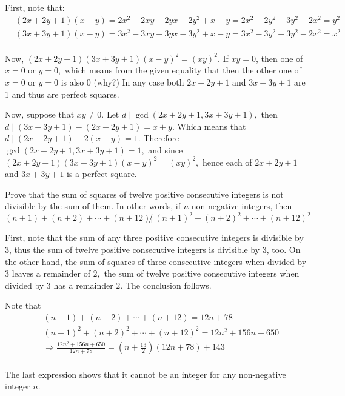 \documentclass{article}
\begin{document}
\begin{soln}
    First, note that:
    \[
        \begin{aligned}
            &(2x+2y+1)(x-y) = 2x^2 - 2xy + 2yx -2y^2 + x - y = 2x^2 - 2y^2 + 3y^2 - 2x^2 = y^2\\
            &(3x+3y+1)(x-y) = 3x^2 - 3xy + 3yx -3y^2 + x - y = 3x^2 - 3y^2 + 3y^2 - 2x^2 = x^2\\
        \end{aligned}
    \]

    Now, $(2x+2y+1)(3x+3y+1)(x-y)^2 = (xy)^2.$ If $xy=0$, then one of $x=0$ or $y=0,$
    which means from the given equality that then the other one of $x=0$ or $y=0$ is also $0$ (why?)
    In any case both $2x+2y+1$ and $3x+3y+1$ are 1 and thus are perfect squares.
    
    Now, suppose that $xy \ne 0.$ Let $d \mid \gcd(2x+2y+1, 3x+3y+1),$ then $d \mid (3x+3y+1) - (2x+2y+1) = x+y.$
    Which means that $d \mid (2x+2y+1) - 2(x+y) = 1.$
    Therefore $\gcd(2x+2y+1, 3x+3y+1) = 1,$ and since $(2x+2y+1)(3x+3y+1)(x-y)^2 = (xy)^2,$
    hence each of $2x+2y+1$ and $3x+3y+1$ is a perfect square.
\end{soln}

\newpage

\begin{example*}[Example 19]
    Prove that the sum of squares of twelve positive consecutive integers is not divisible by the sum of them.
    In other words, if $n$ non-negative integers, then
    \[
        (n+1) + (n+2) + \cdots + (n+12) \not |\ (n+1)^2 + (n+2)^2 + \cdots + (n+12)^2 
    \]
\end{example*}

\begin{soln}[Solution 1]
    First, note that the sum of any three positive consecutive integers is divisible by $3$,
    thus the sum of twelve positive consecutive integers is divisible by $3$, too.
    On the other hand, the sum of squares of three consecutive integers when divided by $3$ leaves a remainder of $2,$
    the sum of twelve positive consecutive integers when divided by $3$ has a remainder $2.$ 
    The conclusion follows.
\end{soln}

\begin{soln}[Solution 2]
    Note that 
    \[
        \begin{aligned}
            &(n+1) + (n+2) + \cdots + (n+12) = 12n+78\\
            &(n+1)^2 + (n+2)^2 + \cdots + (n+12)^2 = 12n^2+156n+650\\
            &\Rightarrow \frac{12n^2 + 156n + 650}{12n+78} = \left( n+ \frac{13}{2} \right)(12n+78) + 143\\
        \end{aligned}
    \]

    The last expression shows that it cannot be an integer for any non-negative integer $n.$
\end{soln}
\end{document}

